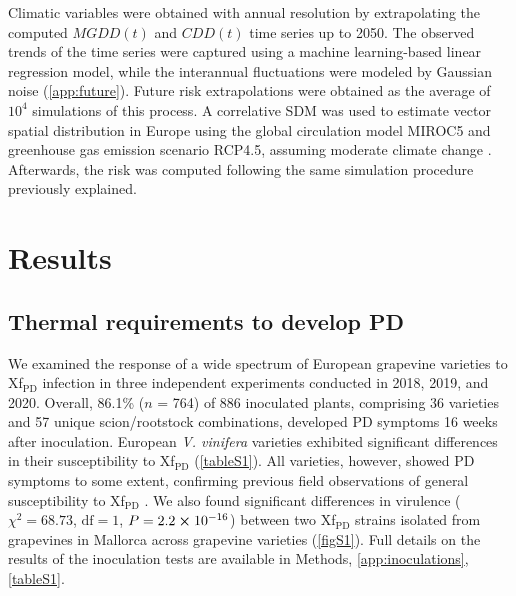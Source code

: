 Climatic variables were obtained with annual resolution by extrapolating the
computed $MGDD(t)$ and $CDD(t)$ time series up to 2050. The observed trends of
the time series were captured using a machine learning-based linear regression
model, while the interannual fluctuations were modeled by Gaussian noise
(\cref{app:future}). Future risk extrapolations were obtained as the average of
$10^4$ simulations of this process. A correlative SDM was used to estimate
vector spatial distribution in Europe using the global circulation model MIROC5
and greenhouse gas emission scenario RCP4.5, assuming moderate climate change
\cite{Godefroid2021}. Afterwards, the risk was computed following the same
simulation procedure previously explained.

\section{Results}

\subsection{Thermal requirements to develop PD} We examined the response of a
wide spectrum of European grapevine varieties to Xf$_{\textrm{PD}}$ infection
in three independent experiments conducted in 2018, 2019, and 2020. Overall,
86.1\% ($n$ = 764) of 886 inoculated plants, comprising 36 varieties and 57
unique scion/rootstock combinations, developed PD symptoms 16 weeks after
inoculation. European \textit{V. vinifera} varieties exhibited significant
differences in their susceptibility to Xf$_{\textrm{PD}}$ (\cref{tableS1}). All
varieties, however, showed PD symptoms to some extent, confirming
previous field observations of general susceptibility to Xf$_{\textrm{PD}}$
\cite{Hopkins2002, Moralejo2019, Purcell2013}.	We also found significant
differences in virulence ($\chi^2=68.73$, $\textrm{df}=1$, $P=2.2 \cross
    10^{-16}$) between two Xf$_{\textrm{PD}}$ strains isolated from grapevines
in Mallorca across grapevine varieties (\cref{figS1}). Full details on the
results of the inoculation tests are available in Methods,
\cref{app:inoculations}, \cref{tableS1}.


